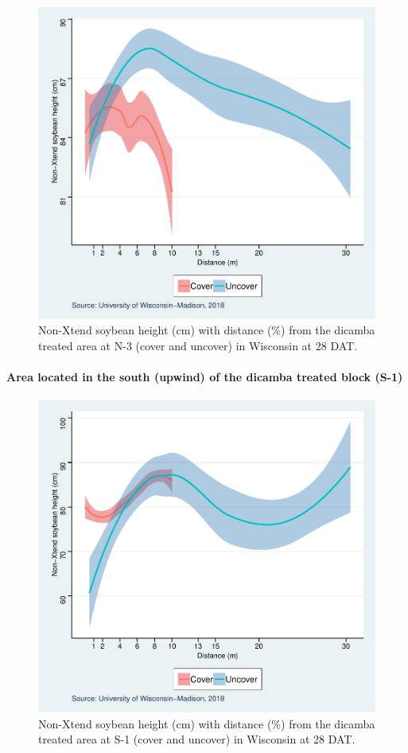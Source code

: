 \documentclass[]{article}
\let\oldparagraph\paragraph
\renewcommand{\paragraph}[1]{\oldparagraph{#1}\mbox{}}
\begin{document}
\begin{figure}
\centering
\includegraphics{Report_Dicamba_study_files/figure-latex/unnamed-chunk-106-1.pdf}
\caption{Non-Xtend soybean height (cm) with distance (\%) from the
dicamba treated area at N-3 (cover and uncover) in Wisconsin at 28 DAT.}
\end{figure}

\pagebreak
\newpage

\paragraph{Area located in the south (upwind) of the dicamba treated
block
(S-1)}\label{area-located-in-the-south-upwind-of-the-dicamba-treated-block-s-1-1}

\begin{figure}
\centering
\includegraphics{Report_Dicamba_study_files/figure-latex/unnamed-chunk-107-1.pdf}
\caption{Non-Xtend soybean height (cm) with distance (\%) from the
dicamba treated area at S-1 (cover and uncover) in Wisconsin at 28 DAT.}
\end{figure}
\end{document}
